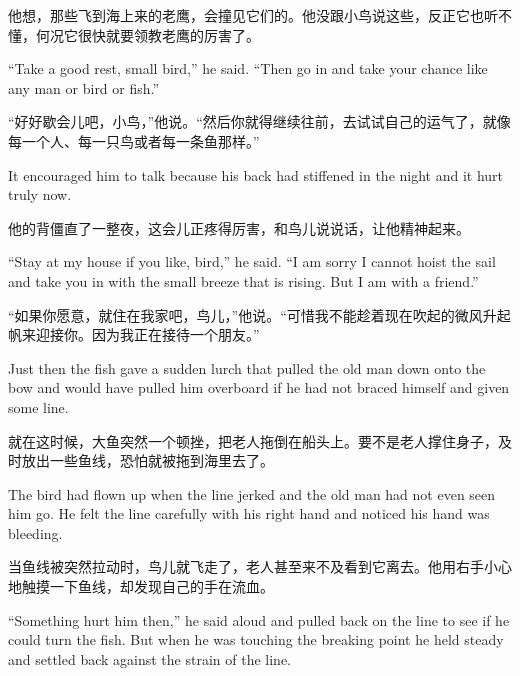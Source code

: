 \begin{paracol}{2}
他想，那些飞到海上来的老鹰，会撞见它们的。他没跟小鸟说这些，反正它也听不懂，何况它很快就要领教老鹰的厉害了。

\switchcolumn*

``Take a good rest, small bird,'' he said. ``Then go in and take your chance
like any man or bird or fish.''

\switchcolumn

“好好歇会儿吧，小鸟，”他说。“然后你就得继续往前，去试试自己的运气了，就像每一个人、每一只鸟或者每一条鱼那样。”

\switchcolumn*

It \gls{encouraged} him to talk because his back had \gls{stiffened} in the
night and it hurt truly now.

\switchcolumn

他的背僵直了一整夜，这会儿正疼得厉害，和鸟儿说说话，让他精神起来。

\switchcolumn*

``Stay at my house if you like, bird,'' he said. ``I am sorry I cannot
\gls{hoist} the sail and take you in with the small breeze that is rising.
But I am with a friend.''

\switchcolumn

“如果你愿意，就住在我家吧，鸟儿，”他说。“可惜我不能趁着现在吹起的微风升起帆来迎接你。因为我正在接待一个朋友。”

\switchcolumn*

Just then the fish gave a sudden lurch that pulled the old man down onto the
bow and would have pulled him \gls{overboard} if he had not braced himself and
given some line.

\switchcolumn

就在这时候，大鱼突然一个顿挫，把老人拖倒在船头上。要不是老人撑住身子，及时放出一些鱼线，恐怕就被拖到海里去了。

\switchcolumn*

The bird had flown up when the line jerked and the old man had not even seen
him go. He felt the line carefully with his right hand and \gls{noticed} his
hand was bleeding.

\switchcolumn

当鱼线被突然拉动时，鸟儿就飞走了，老人甚至来不及看到它离去。他用右手小心地触摸一下鱼线，却发现自己的手在流血。

\switchcolumn*

``Something hurt him then,'' he said aloud and pulled back on the line to
see if he could turn the fish. But when he was touching the breaking point
he held steady and settled back against the strain of the line.


\end{paracol}
